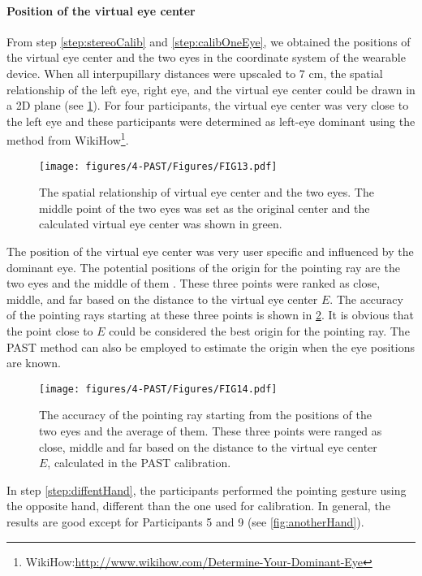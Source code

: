 \paragraph{Position of the virtual eye center} From step \ref{step:stereoCalib} and \ref{step:calibOneEye}, we obtained the positions of the virtual eye center and the two eyes in the coordinate system of the wearable device. When all interpupillary distances were upscaled to 7 cm, the spatial relationship of the left eye, right eye, and the virtual eye center could be drawn in a 2D plane (see \figurename{ \ref{fig:virtualEye}}). For four participants, the virtual eye center was very close to the left eye and these participants were determined as left-eye dominant using the method from  WikiHow\footnote{WikiHow:\url{http://www.wikihow.com/Determine-Your-Dominant-Eye}}.
\begin{figure} 
	\centering
	\texttt{[image: figures/4-PAST/Figures/FIG13.pdf]}
	\caption{The spatial relationship of virtual eye center and the two eyes. The middle point of the two eyes was set as the original center and the calculated virtual eye center was shown in green.}
	\label{fig:virtualEye}
\end{figure}
The position of the virtual eye center was very user specific and influenced by the dominant eye. The potential positions of the origin for the pointing ray are the two eyes and the middle of them \citep{Forsberg1996}. These three points were ranked as close, middle, and far based on the distance to the virtual eye center $E$. The accuracy of the pointing rays starting at these three points is shown in \figurename{ \ref{fig:threeEyePositions}}. It is obvious that the point close to $E$ could be considered the best origin for the pointing ray. The PAST method can also be employed to estimate the origin when the eye positions are known.
\begin{figure} 
	\centering
	\texttt{[image: figures/4-PAST/Figures/FIG14.pdf]}
	\caption{The accuracy of the pointing ray starting from the positions of the two eyes and the average of them. These three points were ranged as close, middle and far based on the distance to the virtual eye center $E$, calculated in the PAST calibration.}
	\label{fig:threeEyePositions}
\end{figure}
In step \ref{step:diffentHand}, the participants performed the pointing gesture using the opposite hand, different than the one used for calibration. In general, the results are good except for Participants 5 and 9 (see \figurename{ \ref{fig:anotherHand}}).  
